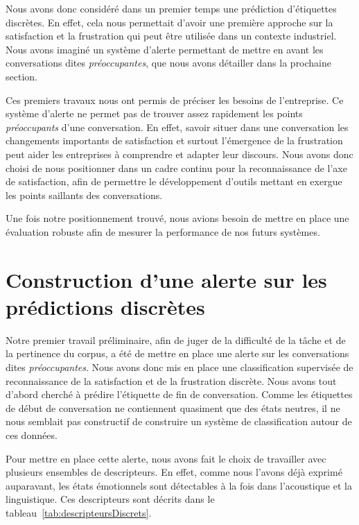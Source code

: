 Nous avons donc considéré dans un premier temps une prédiction d'étiquettes discrètes. En effet, cela nous permettait d'avoir une première approche sur la satisfaction et la frustration qui peut être utilisée dans un contexte industriel. Nous avons imaginé un système d'alerte permettant de mettre en avant les conversations dites \emph{préoccupantes}, que nous avons détailler dans la prochaine section.

Ces premiers travaux nous ont permis de préciser les besoins de l'entreprise. Ce système d'alerte ne permet pas de trouver assez rapidement les points \emph{préoccupants} d'une conversation. En effet, savoir situer dans une conversation les changements importants de satisfaction et surtout l'émergence de la frustration peut aider les entreprises à comprendre et adapter leur discours. Nous avons donc choisi de nous positionner dans un cadre continu pour la reconnaissance de l'axe de satisfaction, afin de permettre le développement d'outils mettant en exergue les points saillants des conversations.

Une fois notre positionnement trouvé, nous avions besoin de mettre en place une évaluation robuste afin de mesurer la performance de nos futurs systèmes.

\section{Construction d'une alerte sur les prédictions discrètes}
Notre premier travail préliminaire, afin de juger de la difficulté de la tâche et de la pertinence du corpus, a été de mettre en place une alerte sur les conversations dites \emph{préoccupantes}. Nous avons donc mis en place une classification supervisée de reconnaissance de la satisfaction et de la frustration discrète. Nous avons tout d'abord cherché à prédire l'étiquette de fin de conversation. Comme les étiquettes de début de conversation ne contiennent quasiment que des états neutres, il ne nous semblait pas constructif de construire un système de classification autour de ces données.

Pour mettre en place cette alerte, nous avons fait le choix de travailler avec plusieurs ensembles de descripteurs. En effet, comme nous l'avons déjà exprimé auparavant, les états émotionnels sont détectables à la fois dans l'acoustique et la linguistique. Ces descripteurs sont décrits dans le tableau~\ref{tab:descripteursDiscrets}.



